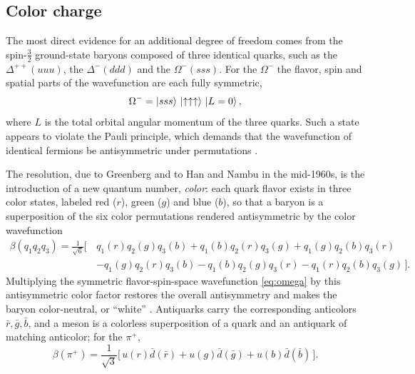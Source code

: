 \subsection{Color charge}
\label{subsec:color}

The most direct evidence for an additional degree of freedom comes from the
spin-$\tfrac{3}{2}$ ground-state baryons composed of three identical quarks, such as
the $\Delta^{++}(uuu)$, the $\Delta^-(ddd)$ and the $\Omega^-(sss)$. For the
$\Omega^-$ the flavor, spin and spatial parts of the wavefunction are each fully
symmetric,
\begin{equation}
    \Omega^- = \ket{sss}\,\ket{\uparrow\uparrow\uparrow}\,\ket{L = 0},
    \label{eq:omega}
\end{equation}
where $L$ is the total orbital angular momentum of the three quarks. Such a state
appears to violate the Pauli principle, which demands that the wavefunction of
identical fermions be antisymmetric under permutations \cite[Ch.~10]{Amsler2018}.

The resolution, due to Greenberg and to Han and Nambu in the mid-1960s, is the
introduction of a new quantum number, \emph{color}: each quark flavor exists in
three color states, labeled red ($r$), green ($g$) and blue ($b$), so that a
baryon is a superposition of the six color permutations rendered antisymmetric by
the color wavefunction
\begin{equation}
\begin{split}
    \beta(q_1 q_2 q_3) = \frac{1}{\sqrt{6}}
    \big[\, & q_1(r)q_2(g)q_3(b) + q_1(b)q_2(r)q_3(g) + q_1(g)q_2(b)q_3(r) \\
    & - q_1(g)q_2(r)q_3(b) - q_1(b)q_2(g)q_3(r) - q_1(r)q_2(b)q_3(g) \,\big].
\end{split}
\end{equation}
Multiplying the symmetric flavor-spin-space wavefunction \eqref{eq:omega} by this
antisymmetric color factor restores the overall antisymmetry and makes the baryon
color-neutral, or ``white'' \cite[Ch.~10]{Amsler2018}. Antiquarks carry the
corresponding anticolors $\bar{r}, \bar{g}, \bar{b}$, and a meson is a colorless
superposition of a quark and an antiquark of matching anticolor; for the $\pi^+$,
\begin{equation}
    \beta(\pi^+) = \frac{1}{\sqrt{3}}
    \big[\, u(r)\bar{d}(\bar{r}) + u(g)\bar{d}(\bar{g}) + u(b)\bar{d}(\bar{b}) \,\big].
\end{equation}

